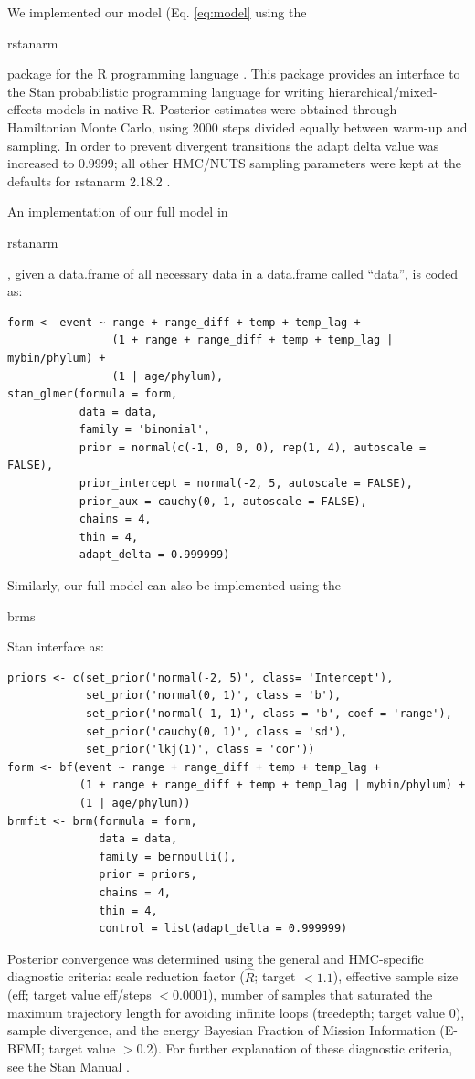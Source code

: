 \documentclass[12pt,letterpaper]{article}
\begin{document}
\begin{refsection}
We implemented our model (Eq. \ref{eq:model} using the \begin{texttt}rstanarm\end{texttt} package for the R programming language \citep{StanManual}. This package provides an interface to the Stan probabilistic programming language for writing hierarchical/mixed-effects models in native R. Posterior estimates were obtained through Hamiltonian Monte Carlo, using 2000 steps divided equally between warm-up and sampling. In order to prevent divergent transitions the adapt delta value was increased to 0.9999; all other HMC/NUTS sampling parameters were kept at the defaults for rstanarm 2.18.2 \citep{rstanarm}.

An implementation of our full model in \begin{texttt}rstanarm\end{texttt}, given a data.frame of all necessary data in a data.frame called ``data'', is coded as:
\begin{verbatim}
form <- event ~ range + range_diff + temp + temp_lag + 
                (1 + range + range_diff + temp + temp_lag | mybin/phylum) + 
                (1 | age/phylum), 
stan_glmer(formula = form,
           data = data, 
           family = 'binomial',
           prior = normal(c(-1, 0, 0, 0), rep(1, 4), autoscale = FALSE), 
           prior_intercept = normal(-2, 5, autoscale = FALSE), 
           prior_aux = cauchy(0, 1, autoscale = FALSE), 
           chains = 4,
           thin = 4,
           adapt_delta = 0.999999)
\end{verbatim}

Similarly, our full model can also be implemented using the \begin{texttt}brms\end{texttt} Stan interface \citep{brms2017,brms2018} as:
\begin{verbatim}
priors <- c(set_prior('normal(-2, 5)', class= 'Intercept'),
            set_prior('normal(0, 1)', class = 'b'),
            set_prior('normal(-1, 1)', class = 'b', coef = 'range'),
            set_prior('cauchy(0, 1)', class = 'sd'),
            set_prior('lkj(1)', class = 'cor'))
form <- bf(event ~ range + range_diff + temp + temp_lag +
           (1 + range + range_diff + temp + temp_lag | mybin/phylum) +
           (1 | age/phylum))
brmfit <- brm(formula = form,
              data = data, 
              family = bernoulli(), 
              prior = priors,
              chains = 4, 
              thin = 4,
              control = list(adapt_delta = 0.999999)
\end{verbatim}

Posterior convergence was determined using the general and HMC-specific diagnostic criteria: scale reduction factor (\(\hat{R}\); target \(<1.1\)), effective sample size (eff; target value eff/steps \(<0.0001\)), number of samples that saturated the maximum trajectory length for avoiding infinite loops (treedepth; target value 0), sample divergence, and the energy Bayesian Fraction of Mission Information (E-BFMI; target value \(>0.2\)). For further explanation of these diagnostic criteria, see the Stan Manual \citep{StanManual}.


\printbibliography[title={Supplementary References}]
\end{refsection}
\end{document}

